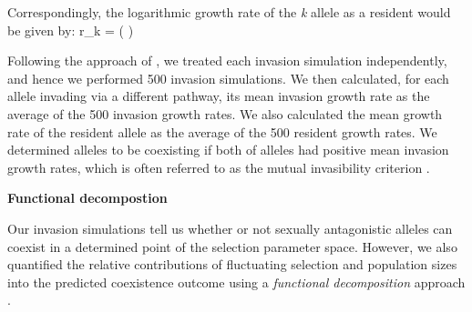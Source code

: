 \documentclass[12pt]{article}
\let\oldequation\equation
\let\oldendequation\endequation
\renewenvironment{equation}
  {\linenomathNonumbers\oldequation}
  {\oldendequation\endlinenomath}
\begin{document}
Correspondingly, the logarithmic growth rate of the \textit{k} allele as a resident would be given by:
\begin{equation}
r_{k} =	\ln \left (  \right )
\label{resident}
\end{equation}

Following the approach of \citet{shoemaker2020}, we treated each invasion simulation independently, and hence we performed 500 invasion simulations. We then calculated, for each allele invading via a different pathway, its mean invasion growth rate as the average of the 500 invasion growth rates. We also calculated the mean growth rate of the resident allele as the average of the 500 resident growth rates. We determined alleles to be coexisting if both of alleles had positive mean invasion growth rates, which is often referred to as the mutual invasibility criterion \citep{barabas_chessons_2018}.

\vspace{5mm}
\noindent\textbf{Functional decompostion}

Our invasion simulations tell us whether or not sexually antagonistic alleles can coexist in a determined point of the selection parameter space. However, we also quantified the relative contributions of fluctuating selection and population sizes into the predicted coexistence outcome using a \textit{functional decomposition} approach \citep{ellner2016quantify,ellner_expanded_2019, shoemaker2020}.



\end{document}
